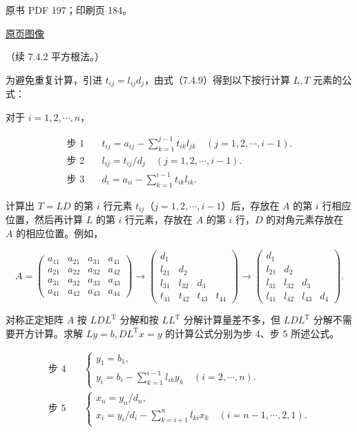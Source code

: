 \documentclass[
  10pt,
  fontset=fandol]{ctexart}
\begin{document}
\clearpage

原书 PDF 197；印刷页 184。

\href{/Users/xiangjunfeng/Desktop/数值计算专用/numerical-analysis/book/source-images/pdf-197.jpeg}{原页图像}

（续 7.4.2 平方根法。）

为避免重复计算，引进 \(t_{ij}=l_{ij}d_j\)，由式（7.4.9）得到以下按行计算
\(L,T\) 元素的公式：

对于 \(i=1,2,\cdots,n\)，

\[
\begin{aligned}
\text{步 1}\quad &t_{ij}=a_{ij}-\sum_{k=1}^{j-1}t_{ik}l_{jk}\quad(j=1,2,\cdots,i-1).\\
\text{步 2}\quad &l_{ij}=t_{ij}/d_j\quad(j=1,2,\cdots,i-1).\\
\text{步 3}\quad &d_i=a_{ii}-\sum_{k=1}^{i-1}t_{ik}l_{ik}.
\end{aligned}
\tag{7.4.10}
\]

计算出 \(T=LD\) 的第 \(i\) 行元素
\(t_{ij}\)（\(j=1,2,\cdots,i-1\)）后，存放在 \(A\) 的第 \(i\)
行相应位置，然后再计算 \(L\) 的第 \(i\) 行元素，存放在 \(A\) 的第 \(i\)
行，\(D\) 的对角元素存放在 \(A\) 的相应位置。例如，

\[
A=\begin{pmatrix}
a_{11}&a_{21}&a_{31}&a_{41}\\
a_{21}&a_{22}&a_{32}&a_{42}\\
a_{31}&a_{32}&a_{33}&a_{43}\\
a_{41}&a_{42}&a_{43}&a_{44}
\end{pmatrix}
\longrightarrow
\begin{pmatrix}
d_1&&&\\
l_{21}&d_2&&\\
l_{31}&l_{32}&d_3&\\
t_{41}&t_{42}&t_{43}&t_{44}
\end{pmatrix}
\longrightarrow
\begin{pmatrix}
d_1&&&\\
l_{21}&d_2&&\\
l_{31}&l_{32}&d_3&\\
l_{41}&l_{42}&l_{43}&d_4
\end{pmatrix}.
\]

对称正定矩阵 \(A\) 按 \(LDL^{\mathrm T}\) 分解和按 \(LL^{\mathrm T}\)
分解计算量差不多，但 \(LDL^{\mathrm T}\) 分解不需要开方计算。求解
\(Ly=b,DL^{\mathrm T}x=y\) 的计算公式分别为步 4、步 5 所述公式。

\[
\begin{aligned}
\text{步 4}\quad &\begin{cases}
y_1=b_1,\\
y_i=b_i-\displaystyle\sum_{k=1}^{i-1}l_{ik}y_h\quad(i=2,\cdots,n).
\end{cases}\\
\text{步 5}\quad &\begin{cases}
x_n=y_n/d_n,\\
x_i=y_i/d_i-\displaystyle\sum_{k=i+1}^{n}l_{ki}x_k\quad(i=n-1,\cdots,2,1).
\end{cases}
\end{aligned}
\tag{7.4.11}
\]
\end{document}
